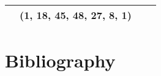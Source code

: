 \documentclass[11pt,a4paper,abstract=yes]{scrartcl}
\theoremstyle{plain}
\begin{document}
\begin{center}
\begin{longtable}{|c|c|c|c|}
   &
 (1, 18, 45, 48, 27, 8, 1)
 \\ \hline
\end{longtable}\end{center}
\section{Bibliography}
\label{sec:org3aa5880}
\printbibliography
\end{document}
